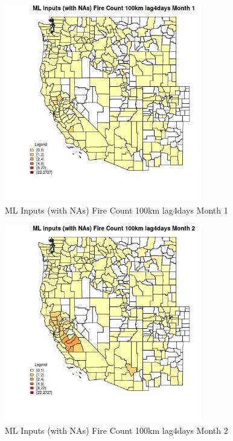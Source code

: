 \begin{figure} 
\centering  
\includegraphics[width=0.77\textwidth]{Code_Outputs/Report_ML_input_PM25_Step4_part_f_de_duplicated_aves_prioritize_24hr_obswNAs_CountyFire_Count_100km_lag4daysmedianMonth1.jpg} 
\caption{\label{fig:Report_ML_input_PM25_Step4_part_f_de_duplicated_aves_prioritize_24hr_obswNAsCountyFire_Count_100km_lag4daysmedianMonth1}ML Inputs (with NAs) Fire Count 100km lag4days Month 1} 
\end{figure} 
 

\begin{figure} 
\centering  
\includegraphics[width=0.77\textwidth]{Code_Outputs/Report_ML_input_PM25_Step4_part_f_de_duplicated_aves_prioritize_24hr_obswNAs_CountyFire_Count_100km_lag4daysmedianMonth2.jpg} 
\caption{\label{fig:Report_ML_input_PM25_Step4_part_f_de_duplicated_aves_prioritize_24hr_obswNAsCountyFire_Count_100km_lag4daysmedianMonth2}ML Inputs (with NAs) Fire Count 100km lag4days Month 2} 
\end{figure} 
 


